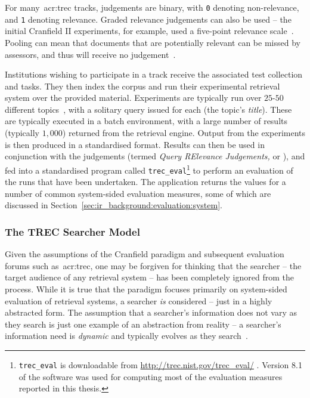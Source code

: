 For many~\gls{acr:trec} tracks, judgements are binary, with \texttt{0} denoting non-relevance, and \texttt{1} denoting relevance. Graded relevance judgements can also be used -- the initial Cranfield II experiments, for example, used a five-point relevance scale~\citep{voorhees2001iir_philosophy}. Pooling can mean that documents that are potentially relevant can be missed by assessors, and thus will receive no judgement~\citep{keenan2001effect}.


Institutions wishing to participate in a track receive the associated test collection and tasks. They then index the corpus and run their experimental retrieval system over the provided material. Experiments are typically run over $25$-$50$ different topics~\citep{voorhees2001iir_philosophy}, with a solitary query issued for each (the topic's \emph{title}). These are typically executed in a batch environment, with a large number of results (typically $1,000$) returned from the retrieval engine. Output from the experiments is then produced in a standardised format. Results can then be used in conjunction with the judgements (termed \emph{Query RElevance Judgements,} or ), and fed into a standardised program called \texttt{trec\_eval}\footnote{\texttt{trec\_eval} is downloadable from \url{http://trec.nist.gov/trec_eval/} . Version 8.1 of the software was used for computing most of the evaluation measures reported in this thesis.} to perform an evaluation of the runs that have been undertaken. The application returns the values for a number of common system-sided evaluation measures, some of which are discussed in Section~\ref{sec:ir_background:evaluation:system}.

\subsubsection{The TREC Searcher Model}\label{sec:ir_background:paradigms:trec:model}
Given the assumptions of the Cranfield paradigm and subsequent evaluation forums such as~\gls{acr:trec}, one may be forgiven for thinking that the searcher -- the target audience of any retrieval system -- has been completely ignored from the process. While it is true that the paradigm focuses primarily on system-sided evaluation of retrieval systems, a searcher \emph{is} considered -- just in a highly abstracted form. The assumption that a searcher's information does not vary as they search is just one example of an abstraction from reality -- a searcher's information need is \emph{dynamic} and typically evolves as they search~\citep{borlund2003iir_model}.


